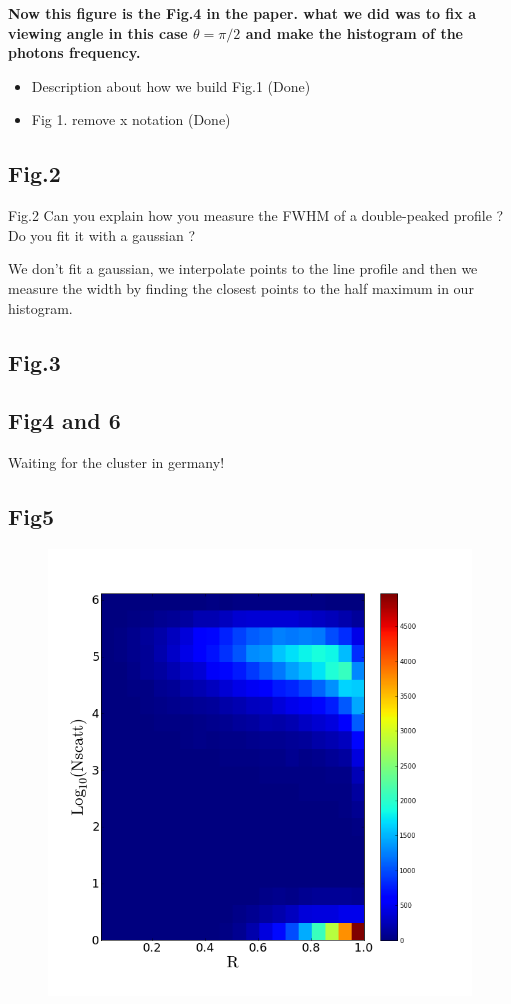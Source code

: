 \documentclass[12pt]{article}
\begin{document}
\textbf{Now this figure is the Fig.4 in the paper. what we did was to fix a viewing angle in this case $\theta= \pi/2$ and make the histogram of the photons frequency.}

\begin{itemize}
\item Description about how we build Fig.1 (Done)
\item Fig 1. remove x notation (Done)
\end{itemize}

\subsection*{Fig.2}

Fig.2 Can you explain how you measure the FWHM of a double-peaked profile ? Do you fit it with a gaussian ?


We don't fit a gaussian, we interpolate points to the line profile and then  we measure the width by finding
the closest points to the half maximum in our histogram.

\subsection*{Fig.3}



\subsection*{Fig4 and 6}

Waiting for the cluster in germany!

\subsection*{Fig5}
\begin{figure}
\includegraphics[scale=0.4]{Histogram2dNscattVSRadius.png}
\end{figure}
\end{document}
